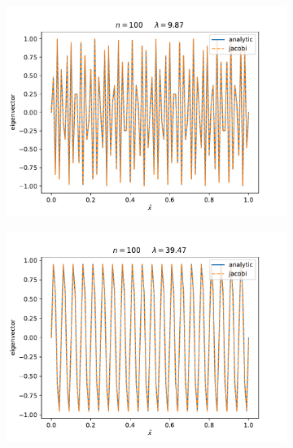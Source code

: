 \documentclass[english,notitlepage]{revtex4-1}  %
\begin{document}
\begin{enumerate}[label= \alph*)]
    \begin{figure}[H]
        \begin{subfigure}{.5 \textwidth}
        \centering
        \includegraphics[width=1.12\textwidth]{../figures/eigvec_100_0.pdf}
        \caption{}
        \label{fig:eigvec_100_0}
    \end{subfigure}
    \begin{subfigure}{.5 \textwidth}
        \centering
        \includegraphics[width=1.12\textwidth]{../figures/eigvec_100_1.pdf}
        \caption{}
        \label{fig:eigvec_100_1}
    \end{subfigure}
    \begin{subfigure}{.5 \textwidth}

\end{subfigure}
\end{figure}
\end{enumerate}
\end{document}
